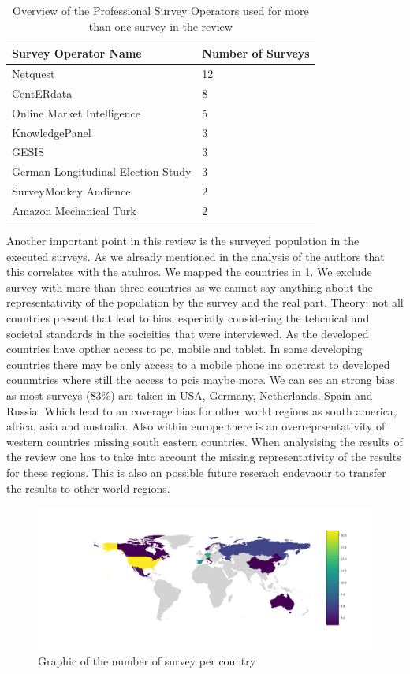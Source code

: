 \begin{table}
	\centering
	\begin{tabular}{ll}
		\toprule
		Survey Operator Name & Number of Surveys \\
		\midrule
        Netquest & 12\\
        CentERdata &8\\
        Online Market Intelligence &5\\
        KnowledgePanel  &3\\
        GESIS &3\\
        German Longitudinal Election Study &3\\
        SurveyMonkey Audience  &2\\
        Amazon Mechanical Turk & 2\\
		\bottomrule 
	\end{tabular}
	\caption{Overview of the Professional Survey Operators used for more than one survey in the review}
	\label{tab: operator}
\end{table}


Another important point in this review is the surveyed population in the executed surveys. As we already mentioned in the analysis of the authors that this correlates with the atuhros. We mapped the countries in \ref{fig: surveys_per_country}. We exclude survey with more than three countries as we cannot say anything about the representativity of the population by the survey and the real part. Theory: not all countries present that lead to bias, especially considering the tehcnical and societal standards in the socieities that were interviewed. As the developed countries have opther access to pc, mobile and tablet. In some developing countries there may be only access to a mobile phone inc onctrast to developed counmtries where still the access to pcis maybe more.  We can see an strong bias as most surveys (83\%) are taken in USA, Germany, Netherlands, Spain and Russia. Which lead to an coverage bias for other world regions as south america, africa, asia and australia. Also within europe there is an overreprsentativity of western countries missing south eastern countries. When analysising the results of the review one has to take into account the missing representativity of the results for these regions. This is also an possible future reserach endevaour to transfer the results to other world regions.

\begin{figure}
    \centering
    \includegraphics[width=\textwidth]{reports/figures/surveys_per_country.png}
     \caption{Graphic of the number of survey per country}
    \label{fig: surveys_per_country}
\end{figure}


